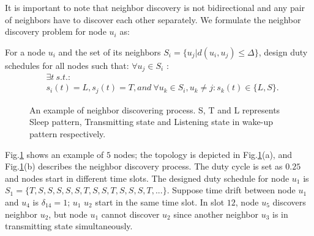 It is important to note that neighbor discovery is not bidirectional and
any pair of neighbors have to discover each other separately.
We formulate the neighbor discovery problem for node $u_i$ as:
\begin{problem}
For a node $u_i$ and the set of its neighbors $S_i = \{u_j | d(u_i, u_j)\leq \Delta \}$, design duty schedules for all nodes such that:
$\forall u_j \in S_i$ :
$$
\begin{aligned}
&\exists t \ s.t. :   \\%
&s_i(t) = L ,
s_{j}(t) = T, and~
\forall u_k \in S_i, u_k \neq j : s_{k}(t) \in \{L, S\}.
\end{aligned}
$$
\end{problem}

\begin{figure}[!h]
\centering
{}
\vspace{0.03in}
\caption{An example of neighbor discovering process. S, T and L represents Sleep pattern,
Transmitting state and Listening state in wake-up pattern respectively.}
\label{NDexample}
\end{figure}

Fig.\ref{NDexample} shows an example of $5$ nodes; the topology is
depicted in Fig.\ref{NDexample}(a), and Fig.\ref{NDexample}(b) describes
the neighbor discovery process. The duty cycle is set as $0.25$ and
nodes start in different time slots.
The designed duty schedule for node $u_1$ is $S_1 = \{ T, S, S, S, S, S, T, S, S, T, S, S, S, T, ... \}$.
Suppose time drift between node $u_1$ and $u_4$ is $\delta_{14} = 1$; $u_1$ $u_2$ start in the same time slot. 
In slot $12$, node $u_5$ discovers neighbor $u_2$, but node $u_1$ cannot discover $u_2$ since another neighbor $u_3$ is in transmitting state simultaneously.

